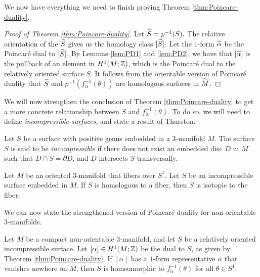 We now have everything we need to finish proving Theorem \ref{thm:Poincare-duality}.
\begin{proof}[Proof of Theorem \ref{thm:Poincare-duality}]
  Let $\widetilde{S}=p^{-1}(S).$
  The relative orientation of the $\widetilde{S}$ gives us the homology class $[\widetilde{S}]$.  Let the $1$-form $\widetilde{\alpha}$ be the Poincar\'e dual to $[\widetilde{S}]$.
  By Lemmas \ref{lem:PD1} and \ref{lem:PD2}, we have that $[\widetilde{\alpha}]$ is the pullback of an element in $H^1(M; \mathbb{Z})$, which is the Poincar\'e dual to the relatively oriented surface $S$.
  It follows from the orientable version of Poincar\'e duality that $\widetilde{S}$ and $p^{-1}(f_{\alpha}^{-1}(\theta))$ are homologous surfaces in $\widetilde{M}$.
\end{proof}

We will now strengthen the conclusion of Theorem \ref{thm:Poincare-duality} to get a more concrete relationship between $S$ and $f_{\alpha}^{-1}(\theta)$.
To do so, we will need to define \emph{incompressible surfaces}, and state a result of Thurston.

  Let $S$ be a surface with positive genus embedded in a $3$-manifold $M$.
  The surface $S$ is said to be \emph{incompressible} if there does not exist an embedded disc $D$ in $M$ such that $D \cap S = \partial D$, and $D$ intersects $S$ transversally.

\begin{thm}
  \label{thm:Thur2}
Let $M$ be an oriented 3-manifold that fibers over $S^1$.  Let $S$ be an incompressible surface embedded in $M$.  If $S$ is homologous to a fiber, then $S$ is isotopic to the fiber.
\end{thm}

We can now state the strengthened version of Poincar\'e duality for non-orientable $3$-manifolds.
\begin{thm}
  \label{thm:strong-duality}
  Let $M$ be a compact non-orientable $3$-manifold, and let $S$ be a relatively oriented incompressible surface.
  Let $[\alpha] \in H^1(M; \mathbb{Z})$ be the dual to $S$, as given by Theorem \ref{thm:Poincare-duality}.
  If $[\alpha]$ has a $1$-form representative $\alpha$ that vanishes nowhere on $M$, then $S$ is homeomorphic to $f_{\alpha}^{-1}(\theta)$ for all $\theta \in S^1$.
\end{thm}


